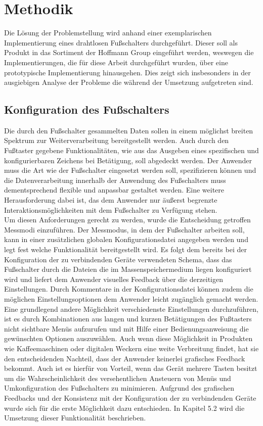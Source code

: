 \section{Methodik}
Die Lösung der Problemstellung wird anhand einer exemplarischen Implementierung eines drahtlosen Fußschalters durchgeführt. Dieser soll als Produkt in das Sortiment der Hoffmann Group eingeführt werden, weswegen die Implementierungen, die für diese Arbeit durchgeführt wurden, über eine prototypische Implementierung hinausgehen. Dies zeigt sich insbesonders in der ausgiebigen Analyse der Probleme die während der Umsetzung aufgetreten sind. 

\subsection{Konfiguration des Fußschalters}
Die durch den Fußschalter gesammelten Daten sollen in einem möglichst breiten Spektrum zur Weiterverarbeitung bereitgestellt werden. Auch durch den Fußtaster gegebene Funktionalitäten, wie aus das Ausgeben eines spezifischen und konfigurierbaren Zeichens bei Betätigung, soll abgedeckt werden. Der Anwender muss die Art wie der Fußschalter eingesetzt werden soll, spezifizieren können und die Datenverarbeitung innerhalb der Anwendung des Fußschalters muss dementsprechend flexible und anpassbar gestaltet werden. Eine weitere Herausforderung dabei ist, das dem Anwender nur äußerst begrenzte Interaktionsmöglichkeiten mit dem Fußschalter zu Verfügung stehen.\\
Um diesen Anforderungen gerecht zu werden, wurde die Entscheidung getroffen Messmodi einzuführen. Der Messmodus, in dem der Fußschalter arbeiten soll, kann in einer zusätzlichen globalen Konfigurationsdatei angegeben werden und legt fest welche Funktionalität bereitgestellt wird. Es folgt dem bereits bei der Konfiguration der zu verbindenden Geräte verwendeten Schema, dass das Fußschalter durch die Dateien die im Massenspeichermedium liegen konfiguriert wird und liefert dem Anwender visuelles Feedback über die derzeitigen Einstellungen. Durch Kommentare in der Konfigurationsdatei können zudem die möglichen Einstellungsoptionen dem Anwender leicht zugänglich gemacht werden.\\
Eine grundlegend andere Möglichkeit verschiedenste Einstellungen durchzuführen, ist es durch Kombinationen aus langen und kurzen Betätigungen des Fußtasters nicht sichtbare Menüs aufzurufen und mit Hilfe einer Bedienungsanweisung die gewünschten Optionen auszuwählen. Auch wenn diese Möglichkeit in Produkten wie Kaffeemaschinen oder digitalen Weckern eine weite Verbreitung findet, hat sie den entscheidenden Nachteil, dass der Anwender keinerlei grafisches Feedback bekommt. Auch ist es hierfür von Vorteil, wenn das Gerät mehrere Tasten besitzt um die Wahrscheinlichkeit des versehentlichen Ansteuern von Menüs und Umkonfiguration des Fußschalters zu minimieren. Aufgrund des grafischen Feedbacks und der Konsistenz mit der Konfiguration der zu verbindenden Geräte wurde sich für die erste Möglichkeit dazu entschieden. In Kapitel 5.2 wird die Umsetzung dieser Funktionalität beschrieben.\\
